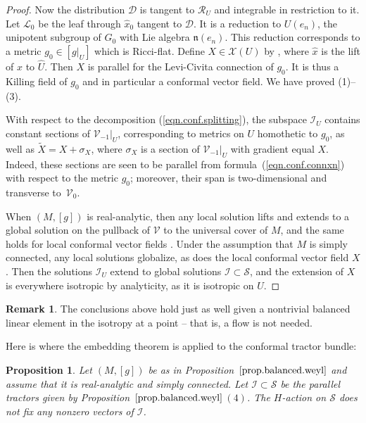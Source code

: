 \documentclass[10pt,a4paper]{amsart}
\numberwithin{equation}{section}
\newtheorem{prop}[thm]{Proposition}
\theoremstyle{definition}
\newtheorem{rem}[thm]{Remark}
\def\n{{\mathfrak n}}
\begin{document}
\begin{proof}
Now the distribution $\mathcal{D}$ is tangent to $\mathcal{R}_U$ and integrable in restriction to it. Let $\mathcal{L}_0$ be the leaf through $\hat{x}_0$ tangent to $\mathcal{D}$. It is a reduction to $U(e_n)$, the unipotent subgroup of $G_0$ with Lie algebra $\n(e_n)$. This reduction corresponds to a metric $g_0 \in [ g|_U]$ which is Ricci-flat. Define $X \in \mathcal{X}(U)$ by , where $\hat{x}$ is the lift of $x$ to $\hat{U}$. Then $X$ is parallel for the Levi-Civita connection of $g_0$. It is thus a Killing field of $g_0$ and in particular a conformal vector field. We have proved (1)--(3).

With respect to the decomposition (\ref{eqn.conf.splitting}), the subspace $\mathcal{I}_U$ contains constant sections of $ \mathcal{V}_{-1} |_U$, corresponding to metrics on $U$ homothetic to $g_0$, as well as $\tilde{X} = X + \sigma_X$, where $\sigma_X$ is a section of $ \mathcal{V}_{-1} |_U$ with gradient equal $X$. Indeed, these sections are seen to be parallel from formula~(\ref{eqn.conf.connxn}) with respect to the metric $g_0$; moreover, their span is two-dimensional and transverse to~$\mathcal{V}_0$.

When $(M,[g])$ is real-analytic, then any local solution lifts and extends to a global solution on the pullback of $\mathcal{V}$ to the universal cover of ${M}$, and the same holds for local conformal vector fields \cite{amores.killing}. Under the assumption that $M$ is simply connected, any local solutions globalize, as does the local conformal vector field $X$. Then the solutions $\mathcal{I}_U$ extend to global solutions $\mathcal{I} \subset \mathcal{S}$, and the extension of $X$ is everywhere isotropic by analyticity, as it is isotropic on $U$.
\end{proof}

\begin{rem}
The conclusions above hold just as well given a nontrivial balanced linear element in the isotropy at a point -- that is, a flow is not needed.
\end{rem}

Here is where the embedding theorem is applied to the conformal tractor bundle:

\begin{prop}
\label{prop.soln.not.fixed}
Let $(M,[g])$ be as in Proposition~$\ref{prop.balanced.weyl}$ and assume that it is real-analytic and simply connected. Let $\mathcal{I} \subset \mathcal{S}$ be the parallel tractors given by Proposition~$\ref{prop.balanced.weyl}$\,$(4)$.
The $H$-action on $\mathcal{S}$ does not fix any nonzero vectors of $\mathcal{I}$.
\end{prop}
\end{document}
